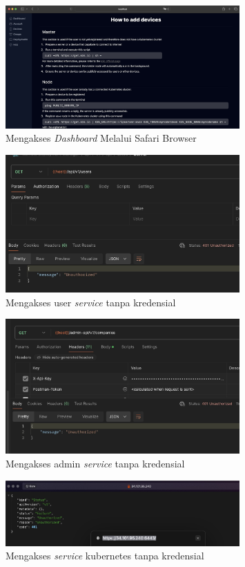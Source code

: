 \begin{figure}[ht]
  \centering
  \includegraphics[width=0.8\textwidth]{resources/chapter-4/pengujian/pengujian-nonfungsional-3.jpg}
  \caption{Mengakses \textit{Dashboard} Melalui Safari Browser}
  \label{fig:akses-dashboard-safari}
\end{figure}

\begin{figure}[ht]
  \centering
  \includegraphics[width=0.8\textwidth]{resources/chapter-4/pengujian/pengujian-nonfungsional-4.jpg}
  \caption{Mengakses user \textit{service} tanpa kredensial}
  \label{fig:akses-service-user}
\end{figure}

\begin{figure}[ht]
  \centering
  \includegraphics[width=0.8\textwidth]{resources/chapter-4/pengujian/pengujian-nonfungsional-5.jpg}
  \caption{Mengakses admin \textit{service} tanpa kredensial}
  \label{fig:akses-service-admin}
\end{figure}

\begin{figure}[ht]
  \centering
  \includegraphics[width=0.8\textwidth]{resources/chapter-4/pengujian/pengujian-nonfungsional-6.jpg}
  \caption{Mengakses \textit{service} kubernetes tanpa kredensial}
  \label{fig:akses-service-kubernetes}
\end{figure}